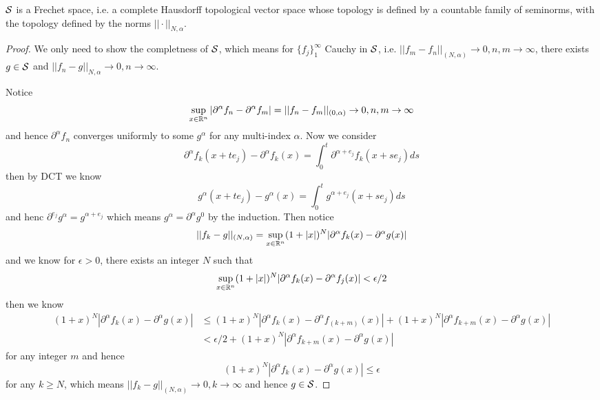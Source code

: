 \begin{proposition}
    $\mathcal{S}$ is a Frechet space, i.e. a complete Hausdorff topological vector space whose topology is defined by a countable family of seminorms, with the topology defined by the norms $||\cdot||_{N,\alpha}$.
\end{proposition}
\begin{proof}\par
    We only need to show the completness of $\mathcal{S}$, which means for $\{f_j\}_1^{\infty}$ Cauchy in $\mathcal{S}$, i.e. $||f_m-f_n||_{(N,\alpha)} \to 0, n,m\to\infty$, there exists $g\in \mathcal{S}$ and $||f_n - g||_{N,\alpha} \to 0, n\to\infty$.\par
    Notice
    \[
    \sup_{x\in\mathbb{R}^n}|\partial^{\alpha}f_n - \partial^{\alpha}f_m| = ||f_n-f_m||_{(0,\alpha)} \to 0, n,m \to \infty
    \]
    and hence $\partial^{\alpha} f_n$ converges uniformly to some $g^{\alpha}$ for any multi-index $\alpha$. Now we consider
    \[
    \partial^{\alpha} f_k(x+te_j) - \partial^{\alpha} f_k(x) = \int_0^t \partial^{\alpha+e_j} f_k(x+se_j)ds
    \]
    then by DCT we know
    \[
    g^{\alpha}(x+te_j) - g^{\alpha}(x) = \int_0^t g^{\alpha+e_j}(x+se_j)ds
    \]
    and henc $\partial^{e_j} g^{\alpha} = g^{\alpha+e_j}$ which means $g^{\alpha} = \partial^{\alpha} g^0$ by the induction. Then notice
    \[
    ||f_k - g||_{(N,\alpha)} = \sup_{x\in\mathbb{R}^n}(1+|x|)^N|\partial^{\alpha} f_k(x) - \partial^{\alpha} g(x)|
    \]
    and we know for $\epsilon > 0$, there exists an integer $N$ such that
    \[\sup_{x\in\mathbb{R}^n}(1+|x|)^N|\partial^{\alpha} f_k(x)-\partial^{\alpha} f_j(x)| < \epsilon/2\]
    then we know
    \[
    \begin{aligned}
    (1+x)^N|\partial^{\alpha} f_k(x) - \partial^{\alpha} g(x)| &\leq (1+x)^N|\partial^{\alpha} f_k(x) - \partial^{\alpha} f_(k+m)(x)|+(1+x)^N|\partial^{\alpha} f_{k+m}(x) - \partial^{\alpha} g(x)| \\ &< \epsilon/2 + (1+x)^N|\partial^{\alpha} f_{k+m}(x) - \partial^{\alpha} g(x)|
    \end{aligned}
    \]
    for any integer $m$ and hence
    \[
    (1+x)^N|\partial^{\alpha} f_k(x) - \partial^{\alpha} g(x)| \leq \epsilon
    \]
    for any $k \geq N$, which means $||f_k - g||_{(N,\alpha)} \to 0, k\to\infty$ and hence $g\in \mathcal{S}$.
\end{proof}


